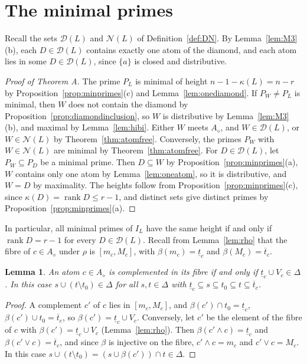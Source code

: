 \documentclass{amsart}
\newtheorem{lemma}[theorem]{Lemma}
\theoremstyle{definition}
\DeclareMathOperator{\rk}{rank}
\newcommand{\cD}{\mathcal D}
\newcommand{\cN}{\mathcal N}
\newcommand{\dm}{\diamond}
\newcommand{\lt}{\underline{t}}
\newcommand{\ut}{\overline{t}}
\begin{document}
\section{The minimal primes}\label{sec:main}

Recall the sets $\cD(L)$ and $\cN(L)$ of Definition~\ref{def:DN}. By Lemma~\ref{lem:M3}(b), each $D\in\cD(L)$ contains exactly one atom of the diamond, and each atom lies in some $D\in\cD(L)$, since $\{a\}$ is closed and distributive.

\begin{proof}[Proof of Theorem A]
The prime $P_L$ is minimal of height $n-1-\kappa(L)=n-r$ by Proposition~\ref{prop:minprimes}(c) and Lemma~\ref{lem:onediamond}. If $P_W\ne P_L$ is minimal, then $W$ does not contain the diamond by Proposition~\ref{prop:diamondinclusion}, so $W$ is distributive by Lemma~\ref{lem:M3}(b), and maximal by Lemma~\ref{lem:hibi}. Either $W$ meets $A_\dm$, and $W\in\cD(L)$, or $W\in\cN(L)$ by Theorem~\ref{thm:atomfree}. Conversely, the primes $P_W$ with $W\in\cN(L)$ are minimal by Theorem~\ref{thm:atomfree}. For $D\in\cD(L)$, let $P_W\subseteq P_D$ be a minimal prime. Then $D\subseteq W$ by Proposition~\ref{prop:minprimes}(a), $W$ contains only one atom by Lemma~\ref{lem:oneatom}, so it is distributive, and $W=D$ by maximality. The heights follow from Proposition~\ref{prop:minprimes}(c), since $\kappa(D)=\rk D\le r-1$, and distinct sets give distinct primes by Proposition~\ref{prop:minprimes}(a).
\end{proof}

In particular, all minimal primes of $I_L$ have the same height if and only if $\rk D=r-1$ for every $D\in\cD(L)$. Recall from Lemma~\ref{lem:rho} that the fibre of $c\in A_\dm$ under $\rho$ is $[m_c,M_c]$, with $\beta(m_c)=\lt_c$ and $\beta(M_c)=\ut_c$.

\begin{lemma}\label{lem:compl}
An atom $c\in A_\dm$ is complemented in its fibre if and only if $\lt_c\cup V_c\in\Delta$. In this case $s\cup(t\setminus t_0)\in\Delta$ for all $s,t\in\Delta$ with $\lt_c\subseteq s\subseteq t_0\subseteq t\subseteq\ut_c$.
\end{lemma}

\begin{proof}
A complement $c'$ of $c$ lies in $[m_c,M_c]$, and $\beta(c')\cap t_0=\lt_c$, $\beta(c')\cup t_0=\ut_c$, so $\beta(c')=\lt_c\cup V_c$. Conversely, let $c'$ be the element of the fibre of $c$ with $\beta(c')=\lt_c\cup V_c$ (Lemma~\ref{lem:rho}). Then $\beta(c'\wedge c)=\lt_c$ and $\beta(c'\vee c)=\ut_c$, and since $\beta$ is injective on the fibre, $c'\wedge c=m_c$ and $c'\vee c=M_c$. In this case $s\cup(t\setminus t_0)=(s\cup\beta(c'))\cap t\in\Delta$.
\end{proof}
\end{document}
